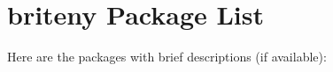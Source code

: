 \section{briteny Package List}
Here are the packages with brief descriptions (if available):\begin{CompactList}
\item{}
\item{}
\end{CompactList}
